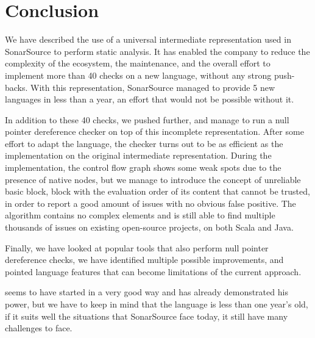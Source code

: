 \section{Conclusion}
\label{sec:conclusion}

We have described the use of a universal intermediate representation used in SonarSource to perform static analysis.
It has enabled the company to reduce the complexity of the ecosystem, the maintenance, and the overall effort to implement more than 40 checks on a new language, without any strong push-backs.
With this representation, SonarSource managed to provide 5 new languages in less than a year, an effort that would not be possible without it.

In addition to these 40 checks, we pushed \slang{} further, and manage to run a null pointer dereference checker on top of this incomplete representation. 
After some effort to adapt the language, the checker turns out to be as efficient as the implementation on the original intermediate representation.
During the implementation, the control flow graph shows some weak spots due to the presence of native nodes, but we manage to introduce the concept of unreliable basic block, block with the evaluation order of its content that cannot be trusted, in order to report a good amount of issues with no obvious false positive.
The algorithm contains no complex elements and is still able to find multiple thousands of issues on existing open-source projects, on both Scala and Java.

Finally, we have looked at popular tools that also perform null pointer dereference checks, we have identified multiple possible improvements, and pointed language features that can become limitations of the current approach.

\slang{} seems to have started in a very good way and has already demonstrated his power, but we have to keep in mind that the language is less than one year's old, if it suits well the situations that SonarSource face today, it still have many challenges to face.
